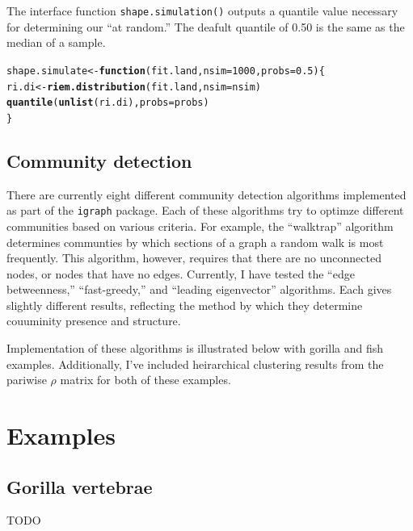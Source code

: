 \documentclass{article}\usepackage{graphicx, color}
\makeatletter
\newcommand{\hlfunctioncall}[1]{\textcolor[rgb]{0.501960784313725,0,0.329411764705882}{\textbf{#1}}}%
\newenvironment{kframe}{%
 \def\at@end@of@kframe{}%
 \ifinner\ifhmode%
  \def\at@end@of@kframe{\end{minipage}}%
  \begin{minipage}{\columnwidth}%
 \fi\fi%
 \def\FrameCommand##1{\hskip\@totalleftmargin \hskip-\fboxsep
 \colorbox{shadecolor}{##1}\hskip-\fboxsep
     \hskip-\linewidth \hskip-\@totalleftmargin \hskip\columnwidth}%
 \MakeFramed {\advance\hsize-\width
   \@totalleftmargin\z@ \linewidth\hsize
   \@setminipage}}%
 {\par\unskip\endMakeFramed%
 \at@end@of@kframe}
\newenvironment{knitrout}{}{} %
\makeatother
\begin{document}


The interface function {\tt{shape.simulation()}} outputs a quantile value necessary for determining our ``at random.'' The deafult quantile of 0.50 is the same as the median of a sample.
\begin{knitrout}\scriptsize
{}\color{fgcolor}\begin{kframe}
\begin{alltt}
shape.simulate <- \hlfunctioncall{function}(fit.land, nsim = 1000, probs = 0.5) \{
    ri.di <- \hlfunctioncall{riem.distribution}(fit.land, nsim = nsim)
    \hlfunctioncall{quantile}(\hlfunctioncall{unlist}(ri.di), probs = probs)
\}
\end{alltt}
\end{kframe}
\end{knitrout}


\subsection{Community detection}

There are currently eight different community detection algorithms implemented as part of the {\tt{igraph}} package.
Each of these algorithms try to optimze different communities based on various criteria.
For example, the ``walktrap'' algorithm determines communties by which sections of a graph a random walk is most frequently.
This algorithm, however, requires that there are no unconnected nodes, or nodes that have no edges.
Currently, I have tested the ``edge betweenness,'' ``fast-greedy,'' and ``leading eigenvector'' algorithms.
Each gives slightly different results, reflecting the method by which they determine couuminity presence and structure.

Implementation of these algorithms is illustrated below with gorilla and fish examples.
Additionally, I've included heirarchical clustering results from the pariwise \(\rho\) matrix for both of these examples.

\section{Examples}
\subsection{Gorilla vertebrae}
TODO
\end{document}
